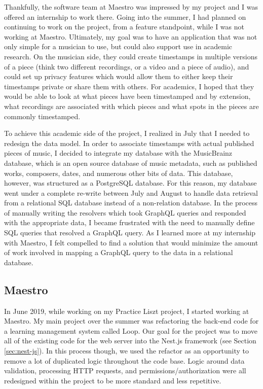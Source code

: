 Thankfully, the software team at Maestro was impressed by my project and I was offered an internship to work there. Going into the summer, I had planned on continuing to work on the project, from a feature standpoint, while I was not working at Maestro.  Ultimately, my goal was to have an application that was not only simple for a musician to use, but could also support use in academic research. On the musician side, they could create timestamps in multiple versions of a piece (think two different recordings, or a video and a piece of audio), and could set up privacy features which would allow them to either keep their timestamps private or share them with others.  For academics, I hoped that they would be able to look at what pieces have been timestamped and by extension, what recordings are associated with which pieces and what spots in the pieces are commonly timestamped.

To achieve this academic side of the project, I realized in July that I needed to redesign the data model.  In order to associate timestamps with actual published pieces of music, I decided to integrate my database with the MusicBrainz database, which is an open source database of music metadata, such as published works, composers, dates, and numerous other bits of data.  This database, however, was structured as a PostgreSQL database.  For this reason, my database went under a complete re-write between July and August to handle data retrieval from a relational SQL database instead of a non-relation database.  In the process of manually writing the resolvers which took GraphQL queries and responded with the appropriate data, I became frustrated with the need to manually define SQL queries that resolved a GraphQL query.  As I learned more at my internship with Maestro, I felt compelled to find a solution that would minimize the amount of work involved in mapping a GraphQL query to the data in a relational database.

\subsection{Maestro}
In June 2019, while working on my Practice Liszt project, I started working at Maestro. My main project over the summer was refactoring the back-end code for a learning management system called Loop.  Our goal  for the project was to move all of the existing code for the web server into the Nest.js framework (see Section \ref{sec:nest-js}).  In this process though, we used the refactor as an opportunity to remove a lot of duplicated logic throughout the code base.  Logic around data validation, processing HTTP requests, and permissions/authorization were all redesigned within the project to be more standard and less repetitive.

